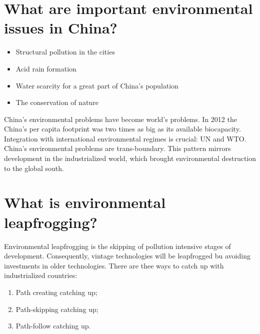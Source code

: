 \section{What are important environmental issues in China?}
\begin{itemize}
\item Structural pollution in the cities
\item Acid rain formation
\item Water scarcity for a great part of China's population
\item The conservation of nature
\end{itemize}
China's environmental problems have become world's problems. In 2012 the China's per capita footprint was two times as big as its available biocapacity. Integration with international environmental regimes is crucial: UN and WTO. China's environmental problems are trans-boundary. This pattern mirrors development in the industrialized world, which brought environmental destruction to the global south. 

\section{What is environmental leapfrogging?}
Environmental leapfrogging is the skipping of pollution intensive stages of development. Consequently, vintage technologies will be leapfrogged bu avoiding investments in older technologies. There are thee ways to catch up with industrialized countries:
\begin{enumerate}
\item Path creating catching up;
\item Path-skipping catching up;
\item Path-follow catching up. 
\end{enumerate}

\clearpage


